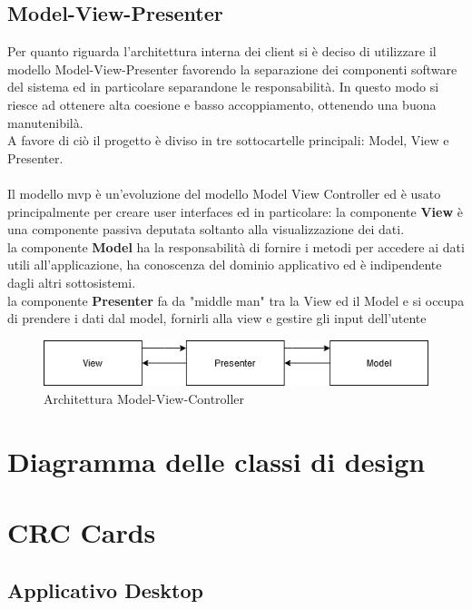 \subsection{Model-View-Presenter}
Per quanto riguarda l'architettura interna dei client si è deciso di utilizzare il modello Model-View-Presenter
favorendo la separazione dei componenti software del sistema ed in particolare separandone le responsabilità.
In questo modo si riesce ad ottenere alta coesione e basso accoppiamento, ottenendo una buona manutenibilà.\\
A favore di ciò il progetto è diviso in tre sottocartelle principali: Model, View e Presenter.\\
\\
Il modello mvp è un'evoluzione del modello Model View Controller ed è usato principalmente per creare user interfaces 
ed in particolare:
la componente \textbf{View} è una componente passiva deputata soltanto alla visualizzazione dei dati.\\
la componente \textbf{Model} ha la responsabilità di fornire i metodi per accedere
ai dati utili all'applicazione, ha conoscenza del dominio applicativo ed è indipendente
dagli altri sottosistemi.\\
la componente \textbf{Presenter} fa da "middle man" tra la View ed il Model e si occupa di prendere i dati dal model, 
fornirli alla view e gestire gli input dell'utente
\begin{center}
    \begin{figure}[H]
        \includegraphics[width=\textwidth]{Figures/MVP client.png}
        \caption{Architettura Model-View-Controller}
    \end{figure}
\end{center}
\section{Diagramma delle classi di design}

\section{CRC  Cards}
\subsection{Applicativo Desktop}
    
    
    
    
    
    
    
